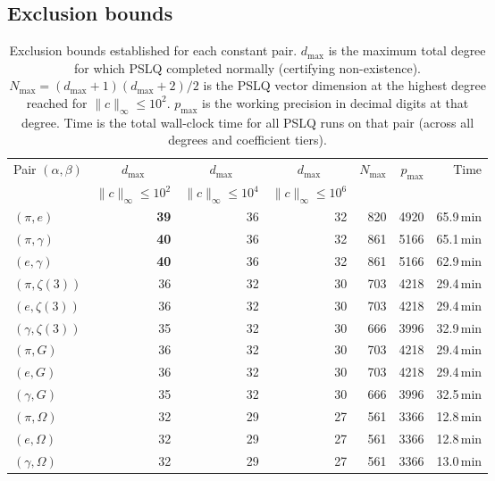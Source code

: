 \documentclass[11pt]{amsart}
\theoremstyle{remark}
\newcommand{\norm}[1]{\lVert #1 \rVert}
\begin{document}
\subsection{Exclusion bounds}\label{ssec:bounds}

\begin{table}[ht]
\centering
\caption{Exclusion bounds established for each constant pair. $d_{\max}$ is the
maximum total degree for which PSLQ completed normally (certifying non-existence).
$N_{\max}=(d_{\max}+1)(d_{\max}+2)/2$ is the PSLQ vector dimension at the highest
degree reached for $\norm{c}_\infty\le 10^2$. $p_{\max}$ is the working precision in
decimal digits at that degree. Time is the total wall-clock time for all PSLQ runs on
that pair (across all degrees and coefficient tiers).}\label{tab:bounds}
\smallskip
\begin{tabular}{@{}l rrr rr r@{}}
\toprule
Pair $(\alpha,\beta)$
  & \multicolumn{1}{c}{$d_{\max}$} & \multicolumn{1}{c}{$d_{\max}$}
  & \multicolumn{1}{c}{$d_{\max}$}
  & $N_{\max}$ & $p_{\max}$ & Time \\
  & \multicolumn{1}{c}{\scriptsize$\norm{c}_\infty\!\le\!10^2$}
  & \multicolumn{1}{c}{\scriptsize$\norm{c}_\infty\!\le\!10^4$}
  & \multicolumn{1}{c}{\scriptsize$\norm{c}_\infty\!\le\!10^6$}
  & & & \\
\midrule
$(\pi,e)$           & \textbf{39} & 36 & 32 & 820 & 4920 & 65.9\,min \\
$(\pi,\gamma)$      & \textbf{40} & 36 & 32 & 861 & 5166 & 65.1\,min \\
$(e,\gamma)$        & \textbf{40} & 36 & 32 & 861 & 5166 & 62.9\,min \\
$(\pi,\zeta(3))$    & 36 & 32 & 30 & 703 & 4218 & 29.4\,min \\
$(e,\zeta(3))$      & 36 & 32 & 30 & 703 & 4218 & 29.4\,min \\
$(\gamma,\zeta(3))$ & 35 & 32 & 30 & 666 & 3996 & 32.9\,min \\
$(\pi,G)$           & 36 & 32 & 30 & 703 & 4218 & 29.4\,min \\
$(e,G)$             & 36 & 32 & 30 & 703 & 4218 & 29.4\,min \\
$(\gamma,G)$        & 35 & 32 & 30 & 666 & 3996 & 32.5\,min \\
$(\pi,\Omega)$      & 32 & 29 & 27 & 561 & 3366 & 12.8\,min \\
$(e,\Omega)$        & 32 & 29 & 27 & 561 & 3366 & 12.8\,min \\
$(\gamma,\Omega)$   & 32 & 29 & 27 & 561 & 3366 & 13.0\,min \\

\end{tabular}
\end{table}
\end{document}

